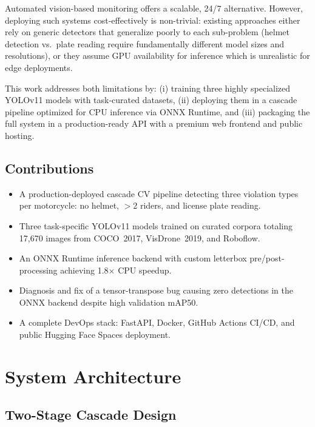 \documentclass[10pt,twocolumn]{article}
\begin{document}
Automated vision-based monitoring offers a scalable, 24/7 alternative.
However, deploying such systems cost-effectively is non-trivial: existing
approaches either rely on generic detectors that generalize poorly to each
sub-problem (helmet detection vs.\ plate reading require fundamentally different
model sizes and resolutions), or they assume GPU availability for inference
which is unrealistic for edge deployments.

This work addresses both limitations by: (i) training three highly specialized
YOLOv11 models with task-curated datasets, (ii) deploying them in a cascade
pipeline optimized for CPU inference via ONNX Runtime, and (iii) packaging the
full system in a production-ready API with a premium web frontend and
public hosting.

\subsection{Contributions}

\begin{itemize}
  \item A production-deployed cascade CV pipeline detecting three violation
        types per motorcycle: no helmet, $>$2 riders, and license plate reading.
  \item Three task-specific YOLOv11 models trained on curated corpora
        totaling 17{,}670 images from COCO~2017, VisDrone~2019, and Roboflow.
  \item An ONNX Runtime inference backend with custom letterbox
        pre/post-processing achieving 1.8$\times$ CPU speedup.
  \item Diagnosis and fix of a tensor-transpose bug causing zero detections
        in the ONNX backend despite high validation mAP50.
  \item A complete DevOps stack: FastAPI, Docker, GitHub Actions CI/CD,
        and public Hugging Face Spaces deployment.
\end{itemize}

\section{System Architecture}

\subsection{Two-Stage Cascade Design}
\end{document}
